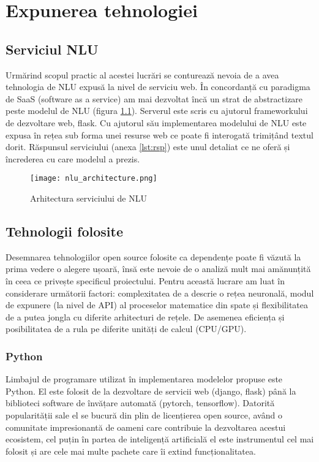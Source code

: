 \chapter{Expunerea tehnologiei}

\section{Serviciul NLU}
Urmărind scopul practic al acestei lucrări se conturează nevoia de a avea tehnologia de NLU expusă la nivel de serviciu web.
În concordanță cu paradigma de SaaS (software as a service) am mai dezvoltat încă un strat de abstractizare peste modelul de NLU (figura \ref{fig:nlu_arch}).
Serverul este scris cu ajutorul frameworkului de dezvoltare web, flask. Cu ajutorul său implementarea modelului de NLU este expusa în rețea sub forma unei resurse web ce poate fi interogată trimițând textul dorit.
Răspunsul serviciului (anexa \ref{lst:rsp}) este unul detaliat ce ne oferă și încrederea cu care modelul a prezis.
\begin{figure}[h]
	\centering
	\texttt{[image: nlu\_architecture.png]}
	\caption{Arhitectura serviciului de NLU}
	\label{fig:nlu_arch}
\end{figure}

\section{Tehnologii folosite}

Desemnarea tehnologiilor open source folosite ca dependențe poate fi văzută la prima vedere o alegere ușoară, însă este nevoie de o analiză mult mai amănunțită în ceea ce privește specificul proiectului.
Pentru această lucrare am luat în considerare următorii factori: complexitatea de a descrie o rețea neuronală, modul de expunere (la nivel de API) al proceselor matematice din spate și flexibilitatea de a putea jongla cu diferite arhitecturi de rețele. De asemenea eficiența și posibilitatea de a rula pe diferite unități de calcul (CPU/GPU).

\subsection{Python}

Limbajul de programare utilizat în implementarea modelelor propuse este Python. El este folosit de la dezvoltare de servicii web (django, flask) până la biblioteci software de învățare automată (pytorch, tensorflow). Datorită popularității sale el se bucură din plin de licențierea open source, având o comunitate impresionantă de oameni care contribuie la dezvoltarea acestui ecosistem, cel puțin în partea de inteligență artificială el este instrumentul cel mai folosit și are cele mai multe pachete care îi extind funcționalitatea. 

